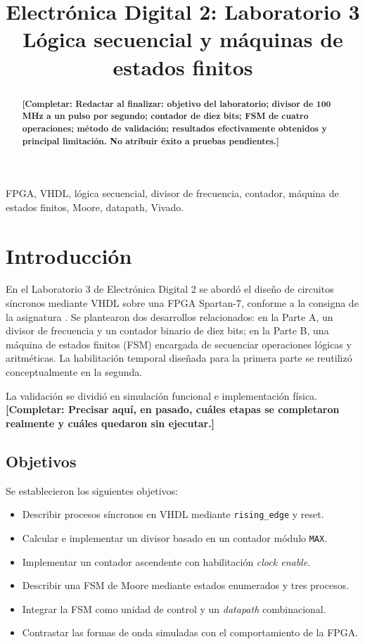 \documentclass[conference]{IEEEtran}
\newcommand{\completar}[1]{\textcolor{pendiente}{\textbf{[Completar: #1]}}}
\begin{document}
\title{Electrónica Digital 2: Laboratorio 3\\Lógica secuencial y máquinas de estados finitos}
\author{
}
\maketitle
\begin{abstract}
\completar{Redactar al finalizar: objetivo del laboratorio; divisor de 100 MHz a un pulso por segundo; contador de diez bits; FSM de cuatro operaciones; método de validación; resultados efectivamente obtenidos y principal limitación. No atribuir éxito a pruebas pendientes.}
\end{abstract}
\begin{IEEEkeywords}
FPGA, VHDL, lógica secuencial, divisor de frecuencia, contador, máquina de estados finitos, Moore, datapath, Vivado.
\end{IEEEkeywords}

\section{Introducción}
En el Laboratorio 3 de Electrónica Digital 2 se abordó el diseño de circuitos síncronos mediante VHDL sobre una FPGA Spartan-7, conforme a la consigna de la asignatura \cite{consigna}. Se plantearon dos desarrollos relacionados: en la Parte A, un divisor de frecuencia y un contador binario de diez bits; en la Parte B, una máquina de estados finitos (FSM) encargada de secuenciar operaciones lógicas y aritméticas. La habilitación temporal diseñada para la primera parte se reutilizó conceptualmente en la segunda.

La validación se dividió en simulación funcional e implementación física. \completar{Precisar aquí, en pasado, cuáles etapas se completaron realmente y cuáles quedaron sin ejecutar.}

\subsection{Objetivos}
Se establecieron los siguientes objetivos:
\begin{itemize}
\item Describir procesos síncronos en VHDL mediante \texttt{rising\_edge} y reset.
\item Calcular e implementar un divisor basado en un contador módulo \texttt{MAX}.
\item Implementar un contador ascendente con habilitación \emph{clock enable}.
\item Describir una FSM de Moore mediante estados enumerados y tres procesos.
\item Integrar la FSM como unidad de control y un \emph{datapath} combinacional.
\item Contrastar las formas de onda simuladas con el comportamiento de la FPGA.
\end{itemize}
\end{document}
